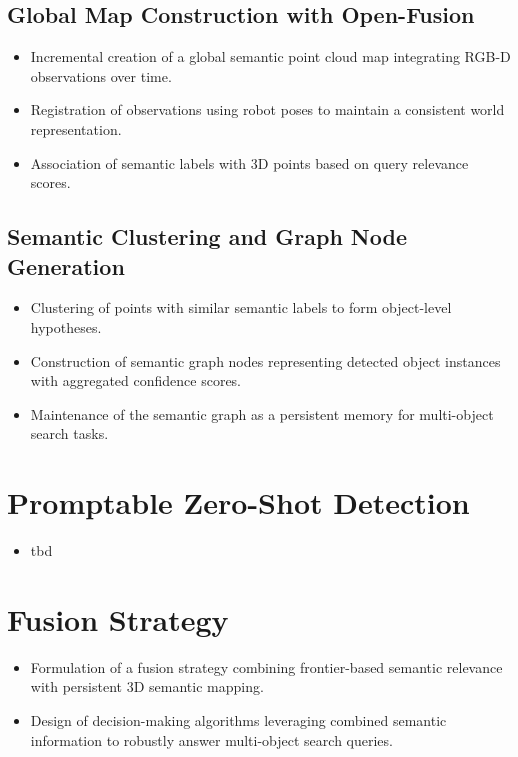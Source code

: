 \subsection{Global Map Construction with Open-Fusion}
\begin{itemize}
    \item Incremental creation of a global semantic point cloud map integrating RGB-D observations over time.
    \item Registration of observations using robot poses to maintain a consistent world representation.
    \item Association of semantic labels with 3D points based on query relevance scores.
\end{itemize}

\subsection{Semantic Clustering and Graph Node Generation}
\begin{itemize}
    \item Clustering of points with similar semantic labels to form object-level hypotheses.
    \item Construction of semantic graph nodes representing detected object instances with aggregated confidence scores.
    \item Maintenance of the semantic graph as a persistent memory for multi-object search tasks.
\end{itemize}

\section{Promptable Zero-Shot Detection}
\begin{itemize}
    \item tbd
\end{itemize}

\section{Fusion Strategy}
\begin{itemize}
    \item Formulation of a fusion strategy combining frontier-based semantic relevance with persistent 3D semantic mapping.
    \item Design of decision-making algorithms leveraging combined semantic information to robustly answer multi-object search queries.
\end{itemize}
